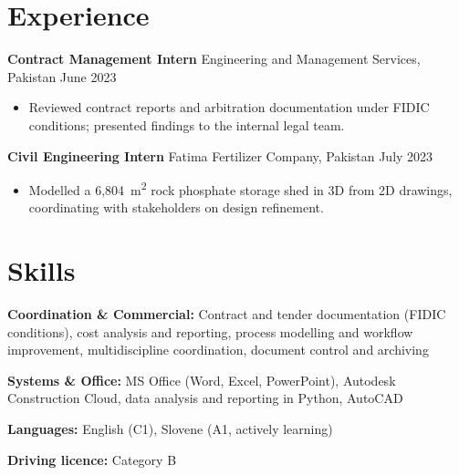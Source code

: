 \documentclass[a4paper,10.5pt]{article}
\newcommand{\datefill}{\dotfill}
\newcommand{\entry}[3]{\vspace{2.5pt}\noindent\textbf{#1} \textbar{} #2 \datefill{} #3\par\vspace{0.5pt}}
\newcommand{\skillrow}[2]{\noindent\textbf{#1:} #2\par\vspace{1pt}}
\begin{document}
\section{Experience}
\entry{Contract Management Intern}{Engineering and Management Services, Pakistan}{June 2023}
\begin{itemize}
  \item Reviewed contract reports and arbitration documentation under FIDIC
        conditions; presented findings to the internal legal team.
\end{itemize}

\entry{Civil Engineering Intern}{Fatima Fertilizer Company, Pakistan}{July 2023}
\begin{itemize}
  \item Modelled a 6,804~m\textsuperscript{2} rock phosphate storage shed in 3D from
        2D drawings, coordinating with stakeholders on design refinement.
\end{itemize}

\section{Skills}

\skillrow{Coordination \& Commercial}{Contract and tender documentation (FIDIC conditions), cost analysis and reporting, process modelling and workflow improvement, multidiscipline coordination, document control and archiving}
\skillrow{Systems \& Office}{MS Office (Word, Excel, PowerPoint), Autodesk Construction Cloud, data analysis and reporting in Python, AutoCAD}

\skillrow{Languages}{English (C1), Slovene (A1, actively learning)}
\skillrow{Driving licence}{Category B}
\end{document}
